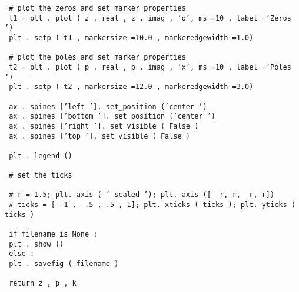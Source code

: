 \documentclass[12pt]{report}
\begin{document}
\begin{verbatim}
 # plot the zeros and set marker properties
 t1 = plt . plot ( z . real , z . imag , ’o’, ms =10 , label =’Zeros ’)
 plt . setp ( t1 , markersize =10.0 , markeredgewidth =1.0)

 # plot the poles and set marker properties
 t2 = plt . plot ( p . real , p . imag , ’x’, ms =10 , label =’Poles ’)
 plt . setp ( t2 , markersize =12.0 , markeredgewidth =3.0)

 ax . spines [’left ’]. set_position (’center ’)
 ax . spines [’bottom ’]. set_position (’center ’)
 ax . spines [’right ’]. set_visible ( False )
 ax . spines [’top ’]. set_visible ( False )

 plt . legend ()

 # set the ticks

 # r = 1.5; plt. axis ( ’ scaled ’); plt. axis ([ -r, r, -r, r])
 # ticks = [ -1 , -.5 , .5 , 1]; plt. xticks ( ticks ); plt. yticks ( ticks )

 if filename is None :
 plt . show ()
 else :
 plt . savefig ( filename )

 return z , p , k
\end{verbatim}
\end{document}
